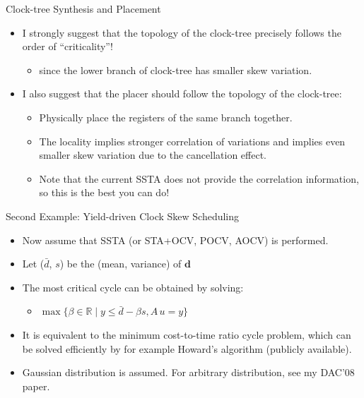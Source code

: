 \documentclass[
  ignorenonframetext,
]{beamer}
\providecommand{\tightlist}{%
  \setlength{\itemsep}{0pt}\setlength{\parskip}{0pt}}
\begin{document}
\begin{frame}{Clock-tree Synthesis and Placement}
\protect\hypertarget{clock-tree-synthesis-and-placement}{}
\begin{itemize}
\tightlist
\item
  I strongly suggest that the topology of the clock-tree precisely
  follows the order of ``criticality''!

  \begin{itemize}
  \tightlist
  \item
    since the lower branch of clock-tree has smaller skew variation.
  \end{itemize}
\item
  I also suggest that the placer should follow the topology of the
  clock-tree:

  \begin{itemize}
  \tightlist
  \item
    Physically place the registers of the same branch together.
  \item
    The locality implies stronger correlation of variations and implies
    even smaller skew variation due to the cancellation effect.
  \item
    Note that the current SSTA does not provide the correlation
    information, so this is the best you can do!
  \end{itemize}
\end{itemize}
\end{frame}

\begin{frame}{Second Example: Yield-driven Clock Skew Scheduling}
\protect\hypertarget{second-example-yield-driven-clock-skew-scheduling}{}
\begin{itemize}
\tightlist
\item
  Now assume that SSTA (or STA+OCV, POCV, AOCV) is performed.
\item
  Let (\(\bar{d}\), \(s\)) be the (mean, variance) of \(\mathbf{d}\)
\item
  The most critical cycle can be obtained by solving:

  \begin{itemize}
  \tightlist
  \item
    \(\max\{\beta \in \mathbb{R} \mid y \leq \bar{d} - \beta s, A\,u = y\}\)
  \end{itemize}
\item
  It is equivalent to the minimum cost-to-time ratio cycle problem,
  which can be solved efficiently by for example Howard's algorithm
  (publicly available).
\item
  Gaussian distribution is assumed. For arbitrary distribution, see my
  DAC'08 paper.
\end{itemize}
\end{frame}
\end{document}
